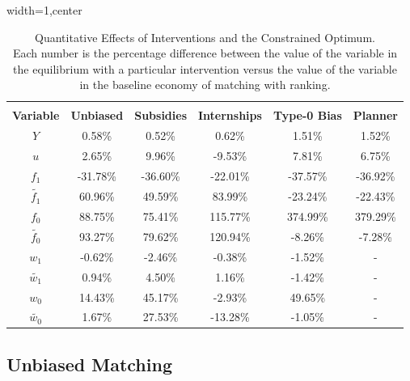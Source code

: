 \documentclass[12pt]{article} %
\theoremstyle{definition}
\begin{document}
\begin{table}[h!]

\begin{adjustbox}{width=1\columnwidth,center}

 \begin{tabular}{||c c c c c c||} 
 \hline
 \\[-1.1em]
 \textbf{Variable} & \textbf{Unbiased} & \textbf{Subsidies} & \textbf{Internships} & \textbf{Type-0 Bias} & \textbf{Planner} \\  
 \hline\hline
  $Y$  & 0.58\% & 0.52\% & 0.62\% & 1.51\% & 1.52\%   \\ 
  $u$  & 2.65\% & 9.96\% & -9.53\% & 7.81\% & 6.75\%   \\ 
  $f_{1}$  & -31.78\% & -36.60\% & -22.01\% & -37.57\% & -36.92\%   \\ 
  $\tilde{f_{1}}$  & 60.96\% & 49.59\% & 83.99\% & -23.24\% & -22.43\% \\
  $f_{0}$  &  88.75\% & 75.41\% & 115.77\% & 374.99\% & 379.29\% \\
  $\tilde{f_{0}}$  & 93.27\% & 79.62\% & 120.94\% & -8.26\% & -7.28\%  \\
  $w_{1}$  & -0.62\% & -2.46\% & -0.38\% & -1.52\% & -  \\
  $\tilde{w_{1}}$ & 0.94\% & 4.50\% & 1.16\% & -1.42\% & - \\
  $w_{0}$  & 14.43\% & 45.17\% & -2.93\% & 49.65\% & - \\
  $\tilde{w_{0}}$ & 1.67\% & 27.53\% & -13.28\% & -1.05\% & - \\ [1ex] 
 \hline
 \end{tabular}
\end{adjustbox}
\centering
     \captionsetup{justification=centering}
\caption{Quantitative Effects of Interventions and the Constrained Optimum. \\ Each number is the percentage difference between the value of the variable in the equilibrium with a particular intervention versus the value of the variable in the baseline economy of matching with ranking.} \label{table_quantitative_results}
\end{table} 

\subsection{Unbiased Matching} \label{section unbiased matching quant}
\end{document}
